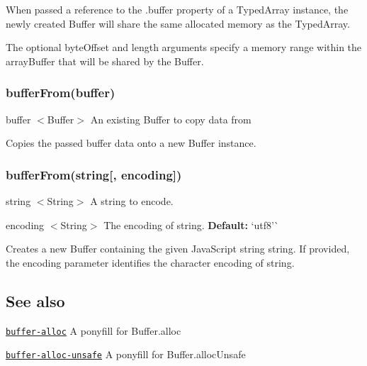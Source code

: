 When passed a reference to the {\ttfamily .buffer} property of a Typed\+Array instance, the newly created {\ttfamily Buffer} will share the same allocated memory as the Typed\+Array.

The optional {\ttfamily byte\+Offset} and {\ttfamily length} arguments specify a memory range within the {\ttfamily array\+Buffer} that will be shared by the {\ttfamily Buffer}.

\subsubsection*{buffer\+From(buffer)}


\begin{DoxyItemize}
\item {\ttfamily buffer} $<$Buffer$>$ An existing {\ttfamily Buffer} to copy data from
\end{DoxyItemize}

Copies the passed {\ttfamily buffer} data onto a new {\ttfamily Buffer} instance.

\subsubsection*{buffer\+From(string\mbox{[}, encoding\mbox{]})}


\begin{DoxyItemize}
\item {\ttfamily string} $<$String$>$ A string to encode.
\item {\ttfamily encoding} $<$String$>$ The encoding of {\ttfamily string}. {\bfseries Default\+:} `\textquotesingle{}utf8'\`{}
\end{DoxyItemize}

Creates a new {\ttfamily Buffer} containing the given Java\+Script string {\ttfamily string}. If provided, the {\ttfamily encoding} parameter identifies the character encoding of {\ttfamily string}.

\subsection*{See also}


\begin{DoxyItemize}
\item \href{https://github.com/LinusU/buffer-alloc}{\tt buffer-\/alloc} A ponyfill for {\ttfamily Buffer.\+alloc}
\item \href{https://github.com/LinusU/buffer-alloc-unsafe}{\tt buffer-\/alloc-\/unsafe} A ponyfill for {\ttfamily Buffer.\+alloc\+Unsafe} 
\end{DoxyItemize}